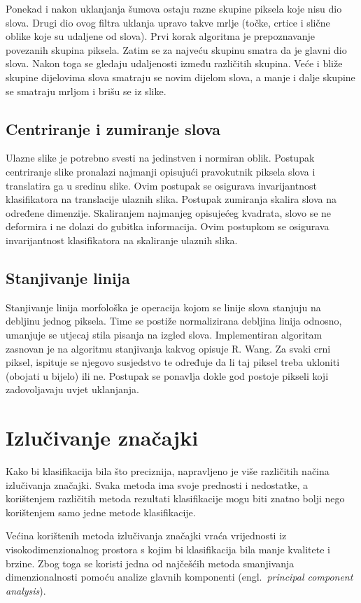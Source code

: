 \documentclass[a4paper,twocolumn,dvipdfm]{article}
\begin{document}
Ponekad i nakon uklanjanja šumova ostaju razne skupine piksela koje nisu dio
slova. Drugi dio ovog filtra uklanja upravo takve mrlje (točke, crtice i slične
oblike koje su udaljene od slova). Prvi korak algoritma je prepoznavanje
povezanih skupina piksela. Zatim se za najveću skupinu smatra da je glavni dio
slova. Nakon toga se gledaju udaljenosti između različitih skupina. Veće i
bliže skupine dijelovima slova smatraju se novim dijelom slova, a manje i dalje
skupine se smatraju mrljom i brišu se iz slike.

\subsection{Centriranje i zumiranje slova}
Ulazne slike je potrebno svesti na jedinstven i normiran oblik. Postupak 
centriranje slike pronalazi najmanji opisujući pravokutnik piksela slova  
i translatira ga u sredinu slike. Ovim postupak se osigurava invarijantnost
klasifikatora na translacije ulaznih slika. Postupak zumiranja skalira slova 
na određene dimenzije. Skaliranjem najmanjeg opisujećeg kvadrata, slovo se 
ne deformira i ne dolazi do gubitka informacija. Ovim postupkom se osigurava 
invarijantnost klasifikatora na skaliranje ulaznih slika.

\subsection{Stanjivanje linija}
Stanjivanje linija morfološka je operacija kojom se linije slova stanjuju na
debljinu jednog piksela. Time se postiže normalizirana debljina linija odnosno,
umanjuje se utjecaj stila pisanja na izgled slova. Implementiran algoritam
zasnovan je na algoritmu stanjivanja kakvog opisuje R.
Wang\cite{Wang2004Online}. Za svaki crni piksel, ispituje se njegovo susjedstvo
te određuje da li taj piksel treba ukloniti (obojati u bijelo) ili ne. Postupak
se ponavlja dokle god postoje pikseli koji zadovoljavaju uvjet uklanjanja.

\section{Izlučivanje značajki}
Kako bi klasifikacija bila što preciznija, napravljeno je više različitih načina
izlučivanja značajki. Svaka metoda ima svoje prednosti i nedostatke, a
korištenjem različitih metoda rezultati klasifikacije mogu biti znatno bolji
nego korištenjem samo jedne metode klasifikacije.

Većina korištenih metoda izlučivanja značajki vraća vrijednosti iz
visokodimenzionalnog prostora s kojim bi klasifikacija bila manje kvalitete i
brzine. Zbog toga se koristi jedna od najčešćih metoda smanjivanja
dimenzionalnosti pomoću analize glavnih komponenti (engl.\ \emph{principal
component analysis}).
\end{document}
